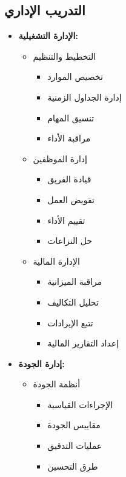 \subsection{التدريب الإداري}
\begin{itemize}
    \item \textbf{الإدارة التشغيلية:}
    \begin{itemize}
        \item التخطيط والتنظيم
        \begin{itemize}
            \item تخصيص الموارد
            \item إدارة الجداول الزمنية
            \item تنسيق المهام
            \item مراقبة الأداء
        \end{itemize}
        
        \item إدارة الموظفين
        \begin{itemize}
            \item قيادة الفريق
            \item تفويض العمل
            \item تقييم الأداء
            \item حل النزاعات
        \end{itemize}
        
        \item الإدارة المالية
        \begin{itemize}
            \item مراقبة الميزانية
            \item تحليل التكاليف
            \item تتبع الإيرادات
            \item إعداد التقارير المالية
        \end{itemize}
    \end{itemize}
    
    \item \textbf{إدارة الجودة:}
    \begin{itemize}
        \item أنظمة الجودة
        \begin{itemize}
            \item الإجراءات القياسية
            \item مقاييس الجودة
            \item عمليات التدقيق
            \item طرق التحسين
        \end{itemize}
        

\end{itemize}
\end{itemize}

